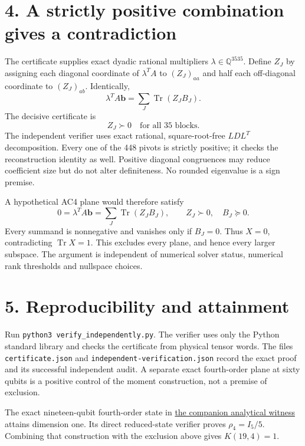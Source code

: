 \documentclass[11pt]{article}
\newcommand{\Tr}{\operatorname{Tr}}\newcommand{\Sym}{\operatorname{Sym}}
\begin{document}
\section*{4. A strictly positive combination gives a contradiction}
The certificate supplies exact dyadic rational multipliers $\lambda\in\mathbb Q^{3535}$. Define $Z_J$ by assigning each diagonal coordinate of $\lambda^TA$ to $(Z_J)_{aa}$ and half each off-diagonal coordinate to $(Z_J)_{ab}$. Identically,
\[\lambda^TA\mathbf b=\sum_J\Tr(Z_JB_J).\]
The decisive certificate is
\[\boxed{Z_J\succ0\quad\text{for all 35 blocks}.}\]
The independent verifier uses exact rational, square-root-free $LDL^T$ decomposition. Every one of the 448 pivots is strictly positive; it checks the reconstruction identity as well. Positive diagonal congruences may reduce coefficient size but do not alter definiteness. No rounded eigenvalue is a sign premise.

A hypothetical AC4 plane would therefore satisfy
\[0=\lambda^TA\mathbf b=\sum_J\Tr(Z_JB_J),\qquad Z_J\succ0,\quad B_J\succeq0.\]
Every summand is nonnegative and vanishes only if $B_J=0$. Thus $X=0$, contradicting $\Tr X=1$. This excludes every plane, and hence every larger subspace. The argument is independent of numerical solver status, numerical rank thresholds and nullspace choices.

\section*{5. Reproducibility and attainment}
Run \texttt{python3 verify\_independently.py}. The verifier uses only the Python standard library and checks the certificate from physical tensor words. The files \texttt{certificate.json} and \texttt{independent-verification.json} record the exact proof and its successful independent audit. A separate exact fourth-order plane at sixty qubits is a positive control of the moment construction, not a premise of exclusion.

The exact nineteen-qubit fourth-order state in \href{../proof.tex}{the companion analytical witness} attains dimension one. Its direct reduced-state verifier proves $\rho_4=I_5/5$. Combining that construction with the exclusion above gives $K(19,4)=1$.
\end{document}
